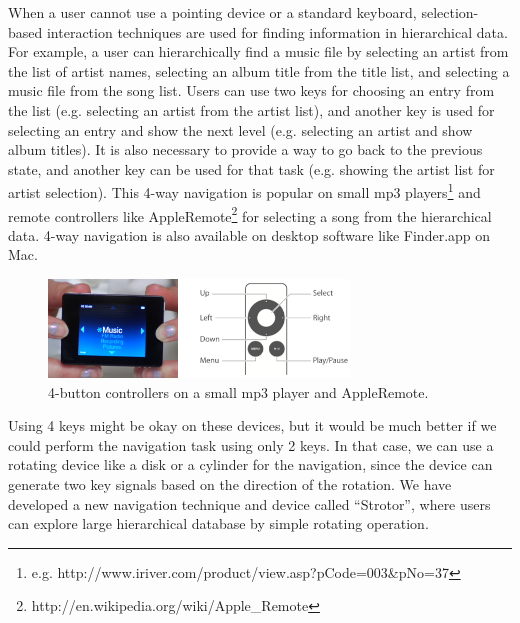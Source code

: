 \documentclass{article}
\begin{document}
When a user cannot use a pointing device or a standard keyboard,
selection-based interaction techniques are used for
finding information in hierarchical data.
For example, a user can hierarchically find a music file by
selecting an artist from the list of artist names,
selecting an album title from the title list,
and selecting a music file from the song list.
Users can use two keys for choosing an entry from the list
(e.g. selecting an artist from the artist list),
and another key is used for selecting an entry and show the next level
(e.g. selecting an artist and show album titles).
It is also necessary to provide a way to go back to the previous state, and
another key can be used for that task
(e.g. showing the artist list for artist selection).
%
This 4-way navigation is popular on small mp3 players\footnote{
  e.g. http://www.iriver.com/product/view.asp?pCode=003\&pNo=37
} and remote controllers like AppleRemote\footnote{http://en.wikipedia.org/wiki/Apple\_Remote}
for selecting a song from the hierarchical data.
4-way navigation is also available on desktop software like Finder.app on Mac.

\begin{figure}[H]
\centerline{\includegraphics[width=80mm,bb=0 0 547 179]{figures/4buttons.png}}
\caption{4-button controllers on a small mp3 player and AppleRemote.}
\label{u10}
\end{figure}



Using 4 keys might be okay on these devices, but it would be much better
if we could perform the navigation task using only 2 keys.
In that case, we can use a rotating device like a disk or a cylinder for the navigation,
since the device can generate two key signals based on the direction of the rotation.
%
%
We have developed a new navigation technique and device called ``Strotor'',
where users can explore large hierarchical database by simple rotating operation.
\end{document}
